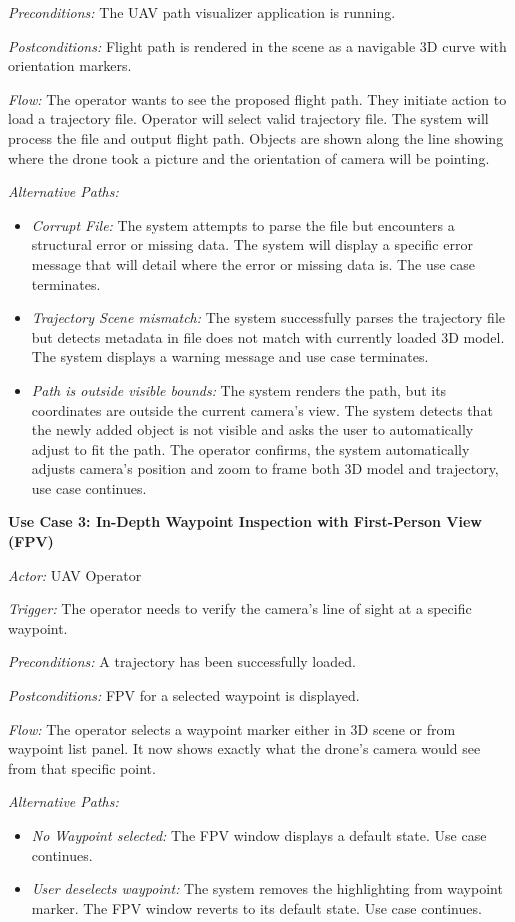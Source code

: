 \documentclass[11pt,a4paper]{article}
\begin{document}
\textit{Preconditions:} The UAV path visualizer application is running.

\textit{Postconditions:} Flight path is rendered in the scene as a navigable 3D curve with orientation markers.

\textit{Flow:} The operator wants to see the proposed flight path. They initiate action to load a trajectory file. Operator will select valid trajectory file. The system will process the file and output flight path. Objects are shown along the line showing where the drone took a picture and the orientation of camera will be pointing.

\textit{Alternative Paths:}
\begin{itemize}
\item \textit{Corrupt File:} The system attempts to parse the file but encounters a structural error or missing data. The system will display a specific error message that will detail where the error or missing data is. The use case terminates.
\item \textit{Trajectory Scene mismatch:} The system successfully parses the trajectory file but detects metadata in file does not match with currently loaded 3D model. The system displays a warning message and use case terminates.
\item \textit{Path is outside visible bounds:} The system renders the path, but its coordinates are outside the current camera's view. The system detects that the newly added object is not visible and asks the user to automatically adjust to fit the path. The operator confirms, the system automatically adjusts camera's position and zoom to frame both 3D model and trajectory, use case continues.
\end{itemize}

\textbf{Use Case 3: In-Depth Waypoint Inspection with First-Person View (FPV)}

\textit{Actor:} UAV Operator

\textit{Trigger:} The operator needs to verify the camera's line of sight at a specific waypoint.

\textit{Preconditions:} A trajectory has been successfully loaded.

\textit{Postconditions:} FPV for a selected waypoint is displayed.

\textit{Flow:} The operator selects a waypoint marker either in 3D scene or from waypoint list panel. It now shows exactly what the drone's camera would see from that specific point.

\textit{Alternative Paths:}
\begin{itemize}
\item \textit{No Waypoint selected:} The FPV window displays a default state. Use case continues.
\item \textit{User deselects waypoint:} The system removes the highlighting from waypoint marker. The FPV window reverts to its default state. Use case continues.
\end{itemize}
\end{document}
